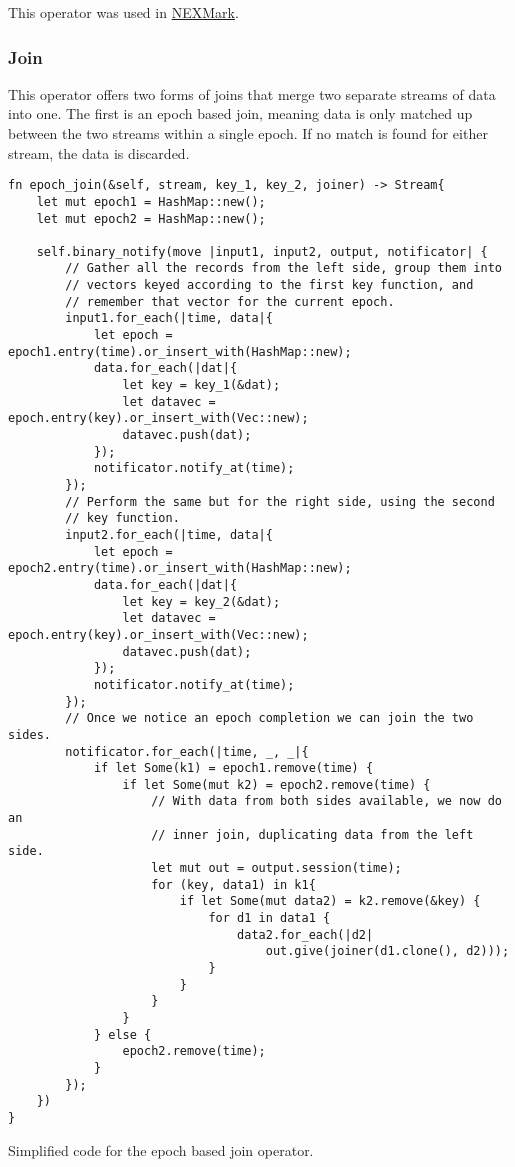 \noindent This operator was used in \hyperref[section:nexmark]{NEXMark}.

\subsubsection{Join}
This operator offers two forms of joins that merge two separate streams of data into one. The first is an epoch based join, meaning data is only matched up between the two streams within a single epoch. If no match is found for either stream, the data is discarded.

\begin{listing}[H]
\begin{verbatim}
fn epoch_join(&self, stream, key_1, key_2, joiner) -> Stream{
    let mut epoch1 = HashMap::new();
    let mut epoch2 = HashMap::new();
    
    self.binary_notify(move |input1, input2, output, notificator| {
        // Gather all the records from the left side, group them into
        // vectors keyed according to the first key function, and
        // remember that vector for the current epoch.
        input1.for_each(|time, data|{
            let epoch = epoch1.entry(time).or_insert_with(HashMap::new);
            data.for_each(|dat|{
                let key = key_1(&dat);
                let datavec = epoch.entry(key).or_insert_with(Vec::new);
                datavec.push(dat);
            });
            notificator.notify_at(time);
        });
        // Perform the same but for the right side, using the second
        // key function.
        input2.for_each(|time, data|{
            let epoch = epoch2.entry(time).or_insert_with(HashMap::new);
            data.for_each(|dat|{
                let key = key_2(&dat);
                let datavec = epoch.entry(key).or_insert_with(Vec::new);
                datavec.push(dat);
            });
            notificator.notify_at(time);
        });
        // Once we notice an epoch completion we can join the two sides.
        notificator.for_each(|time, _, _|{
            if let Some(k1) = epoch1.remove(time) {
                if let Some(mut k2) = epoch2.remove(time) {
                    // With data from both sides available, we now do an
                    // inner join, duplicating data from the left side.
                    let mut out = output.session(time);
                    for (key, data1) in k1{
                        if let Some(mut data2) = k2.remove(&key) {
                            for d1 in data1 {
                                data2.for_each(|d2|
                                    out.give(joiner(d1.clone(), d2)));
                            }
                        }
                    }
                }
            } else {
                epoch2.remove(time);
            }
        });
    })
}
\end{verbatim}
  \caption{Simplified code for the epoch based join operator.}
  \label{lst:epoch-join}
\end{listing}

